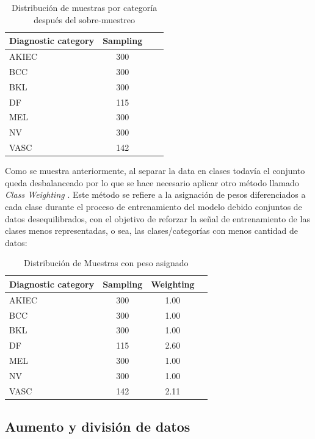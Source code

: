 \begin{table}[h]
   \centering
   \begin{tabular}{lccc}
   \hline
   Diagnostic category & Sampling  \\ \hline
   AKIEC & 300 \\
   BCC & 300 \\
   BKL & 300 \\
   DF & 115 \\
   MEL & 300 \\
   NV & 300 \\
   VASC & 142 \\ \hline
   \end{tabular}
   \caption{Distribución de muestras por categoría después del sobre-muestreo}
   \label{tab:sampling_distribution}
   \end{table}

Como se muestra anteriormente, al separar la data en clases todavía el conjunto queda desbalanceado por lo que se hace necesario aplicar otro método llamado \textit{Class Weighting} . Este método se refiere a la asignación de pesos diferenciados a cada clase durante el proceso de entrenamiento del modelo debido conjuntos de datos desequilibrados, con el objetivo de reforzar la señal de entrenamiento de las clases menos representadas, o sea, las clases/categorías con menos cantidad de datos:

\begin{table}[h]
   \centering
   \begin{tabular}{lccc}
   \hline
   Diagnostic category & Sampling  & Weighting\\ \hline
   AKIEC & 300 & 1.00\\
   BCC & 300 & 1.00\\
   BKL & 300 & 1.00\\
   DF & 115 & 2.60\\
   MEL & 300 & 1.00\\
   NV & 300 & 1.00\\
   VASC & 142 & 2.11\\ \hline
   \end{tabular}
   \caption{Distribución de Muestras con peso asignado}
   \label{tab:weighting_distribution}
   \end{table}

\subsection{Aumento y división de datos}

